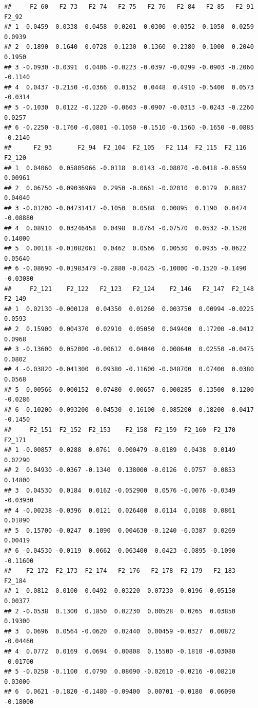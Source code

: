 \documentclass[]{article}
\begin{document}
\begin{verbatim}
##     F2_60   F2_73   F2_74   F2_75   F2_76   F2_84   F2_85   F2_91   F2_92
## 1 -0.0459  0.0338 -0.0458  0.0201  0.0300 -0.0352 -0.1050  0.0259  0.0939
## 2  0.1890  0.1640  0.0728  0.1230  0.1360  0.2380  0.1000  0.2040  0.1950
## 3 -0.0930 -0.0391  0.0406 -0.0223 -0.0397 -0.0299 -0.0903 -0.2060 -0.1140
## 4  0.0437 -0.2150 -0.0366  0.0152  0.0448  0.4910 -0.5400  0.0573 -0.0314
## 5 -0.1030  0.0122 -0.1220 -0.0603 -0.0907 -0.0313 -0.0243 -0.2260  0.0257
## 6 -0.2250 -0.1760 -0.0801 -0.1050 -0.1510 -0.1560 -0.1650 -0.0885 -0.2140
##      F2_93       F2_94  F2_104  F2_105   F2_114  F2_115  F2_116   F2_120
## 1  0.04060  0.05805066 -0.0118  0.0143 -0.08070 -0.0418 -0.0559  0.00961
## 2  0.06750 -0.09036969  0.2950 -0.0661 -0.02010  0.0179  0.0837  0.04040
## 3 -0.01200 -0.04731417 -0.1050  0.0588  0.00895  0.1190  0.0474 -0.08880
## 4  0.08910  0.03246458  0.0498  0.0764 -0.07570  0.0532 -0.1520  0.14000
## 5  0.00118 -0.01082061  0.0462  0.0566  0.00530  0.0935 -0.0622  0.05640
## 6 -0.08690 -0.01983479 -0.2880 -0.0425 -0.10000 -0.1520 -0.1490 -0.03080
##     F2_121    F2_122   F2_123   F2_124    F2_146   F2_147  F2_148  F2_149
## 1  0.02130 -0.000128  0.04350  0.01260  0.003750  0.00994 -0.0225  0.0593
## 2  0.15900  0.004370  0.02910  0.05050  0.049400  0.17200 -0.0412  0.0968
## 3 -0.13600  0.052000 -0.00612  0.04040  0.008640  0.02550 -0.0475  0.0802
## 4 -0.03820 -0.041300  0.09380 -0.11600 -0.048700  0.07400  0.0380  0.0568
## 5  0.00566 -0.000152  0.07480 -0.00657 -0.000285  0.13500  0.1200 -0.0286
## 6 -0.10200 -0.093200 -0.04530 -0.16100 -0.085200 -0.18200 -0.0417 -0.1450
##     F2_151  F2_152  F2_153    F2_158  F2_159  F2_160  F2_170   F2_171
## 1 -0.00857  0.0288  0.0761  0.000479 -0.0189  0.0438  0.0149  0.02290
## 2  0.04930 -0.0367 -0.1340  0.138000 -0.0126  0.0757  0.0853  0.14800
## 3  0.04530  0.0184  0.0162 -0.052900  0.0576 -0.0076 -0.0349 -0.03930
## 4 -0.00238 -0.0396  0.0121  0.026400  0.0114  0.0108  0.0861  0.01890
## 5  0.15700 -0.0247  0.1090  0.004630 -0.1240 -0.0387  0.0269  0.00419
## 6 -0.04530 -0.0119  0.0662 -0.063400  0.0423 -0.0895 -0.1090 -0.11600
##    F2_172  F2_173  F2_174   F2_176   F2_178  F2_179   F2_183   F2_184
## 1  0.0812 -0.0100  0.0492  0.03220  0.07230 -0.0196 -0.05150  0.00377
## 2 -0.0538  0.1300  0.1850  0.02230  0.00528  0.0265  0.03850  0.19300
## 3  0.0696  0.0564 -0.0620  0.02440  0.00459 -0.0327  0.00872 -0.04460
## 4  0.0772  0.0169  0.0694  0.00808  0.15500 -0.1810 -0.03080 -0.01700
## 5 -0.0258 -0.1100  0.0790  0.08090 -0.02610 -0.0216 -0.08210  0.03000
## 6  0.0621 -0.1820 -0.1480 -0.09400  0.00701 -0.0180  0.06090 -0.18000

\end{verbatim}
\end{document}
